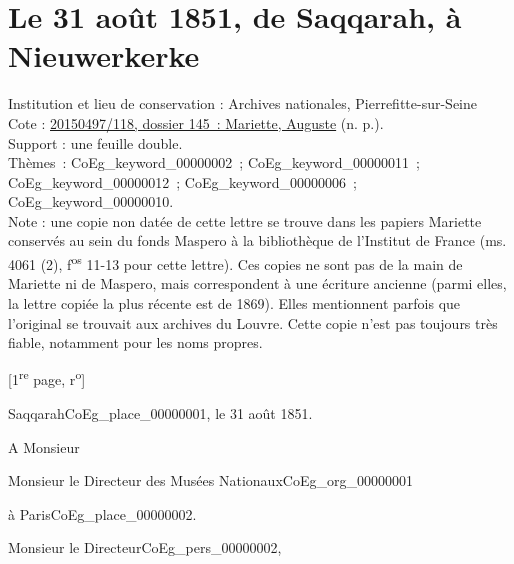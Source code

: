 \documentclass{book}
\begin{document}
\section*{Le 31 août 1851, de Saqqarah, à Nieuwerkerke}
{\footnotesize
\noindent Institution et lieu de conservation : Archives nationales, Pierrefitte-sur-Seine\\
Cote : \hyperlink{CoEg_Mariette_ms_001}{20150497/118, dossier 145~: Mariette, Auguste} (n. p.).\\
Support : une feuille double.\\
Thèmes~: \gls{CoEg_keyword_00000002}~; \gls{CoEg_keyword_00000011}~; \gls{CoEg_keyword_00000012}~; \gls{CoEg_keyword_00000006}~; \gls{CoEg_keyword_00000010}.\\
Note : une copie non datée de cette lettre se trouve dans les papiers Mariette conservés au sein du fonds Maspero à la bibliothèque de l’Institut de France (ms. 4061 (2), f\textsuperscript{os} 11-13 pour cette lettre). Ces copies ne sont pas de la main de Mariette ni de Maspero, mais correspondent à une écriture ancienne (parmi elles, la lettre copiée la plus récente est de 1869). Elles mentionnent parfois que l’original se trouvait aux archives du Louvre. Cette copie n’est pas toujours très fiable, notamment pour les noms propres.
\begin{center} {[1\textsuperscript{re} page, r\textsuperscript{o}]}\end{center}}
\begin{flushright}Saqqarah\gls{CoEg_place_00000001}, le 31 août 1851.\end{flushright}
A Monsieur
\begin{center}Monsieur le Directeur des Musées Nationaux\gls{CoEg_org_00000001}\end{center}
\begin{flushright}à Paris\gls{CoEg_place_00000002}.\end{flushright}

\indent \hspace{1cm}Monsieur le Directeur\gls{CoEg_pers_00000002},\\
\end{document}
